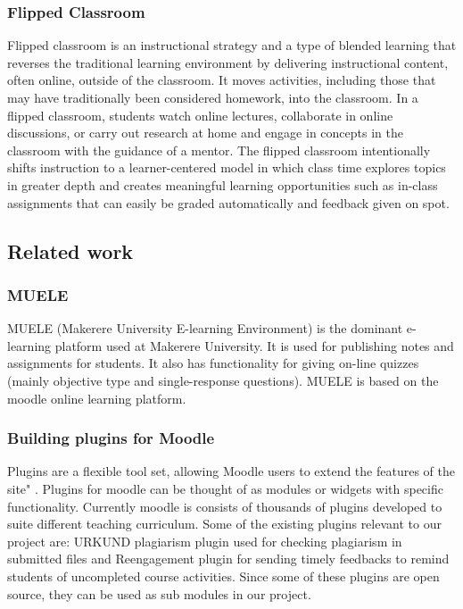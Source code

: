 \documentclass[12pt]{article}
\begin{document}
		\subsubsection{Flipped Classroom}
		Flipped classroom is an instructional strategy and a type of blended learning that reverses the traditional learning environment by delivering instructional content, often online, outside of the classroom. It moves activities, including those that may have traditionally been considered homework, into the classroom. In a flipped classroom, students watch online lectures, collaborate in online discussions, or carry out research at home and engage in concepts in the classroom with the guidance of a mentor. The flipped classroom intentionally shifts instruction to a learner-centered model in which class time explores topics in greater depth and creates meaningful learning opportunities such as in-class assignments that can easily be graded automatically and feedback given on spot.

	\subsection{Related work}
		\subsubsection{MUELE}
		MUELE (Makerere University E-learning Environment) \cite{muele} is the dominant e-learning platform used at Makerere University. It is used for publishing notes and assignments for students. It also has functionality for giving on-line quizzes (mainly objective type and single-response questions). MUELE is based on the moodle online learning platform.

		\subsubsection{Building plugins for Moodle}
		Plugins are a flexible tool set, allowing Moodle users to extend the features of the site" \cite{moodle}. Plugins for moodle can be thought of as modules or widgets with specific functionality. Currently moodle is consists of thousands of plugins developed to suite different teaching curriculum. Some of the existing plugins relevant to our project are: URKUND plagiarism plugin \cite{urkund} used for checking plagiarism in submitted files and Reengagement plugin \cite{reengagement} for sending timely feedbacks to remind students of uncompleted course activities. Since some of these plugins are open source, they can be used as sub modules in our project.\\
		
\end{document}
